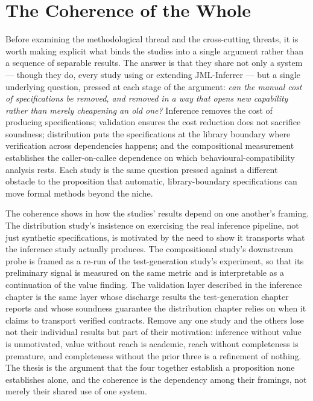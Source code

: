 \section{The Coherence of the Whole}
\label{sec:syn-coherence}

Before examining the methodological thread and the cross-cutting threats, it is
worth making explicit what binds the studies into a single argument rather than a
sequence of separable results. The answer is that they share not only a system ---
though they do, every study using or extending JML-Inferrer --- but a single
underlying question, pressed at each stage of the argument: \emph{can the manual
cost of specifications be removed, and removed in a way that opens new capability
rather than merely cheapening an old one?} Inference removes the cost of producing
specifications; validation ensures the cost reduction does not sacrifice
soundness; distribution puts the specifications at the library boundary where
verification across dependencies happens; and the compositional measurement
establishes the caller-on-callee dependence on which behavioural-compatibility
analysis rests. Each study is the same question pressed against a different
obstacle to the proposition that automatic, library-boundary specifications can
move formal methods beyond the niche.

The coherence shows in how the studies' results depend on one another's framing. The
distribution study's insistence on exercising the real inference pipeline, not just
synthetic specifications, is motivated by the need to show it transports what the
inference study actually produces. The compositional study's downstream probe is
framed as a re-run of the test-generation study's experiment, so that its preliminary
signal is measured on the same metric and is interpretable as a continuation of the
value finding. The validation layer described in the inference chapter is the same
layer whose discharge results the test-generation chapter reports and whose
soundness guarantee the distribution chapter relies on when it claims to transport
verified contracts. Remove any one study and the others lose not their individual
results but part of their motivation: inference without value is unmotivated, value
without reach is academic, reach without completeness is premature, and completeness
without the prior three is a refinement of nothing. The thesis is the argument that
the four together establish a proposition none establishes alone, and the coherence
is the dependency among their framings, not merely their shared use of one system.

